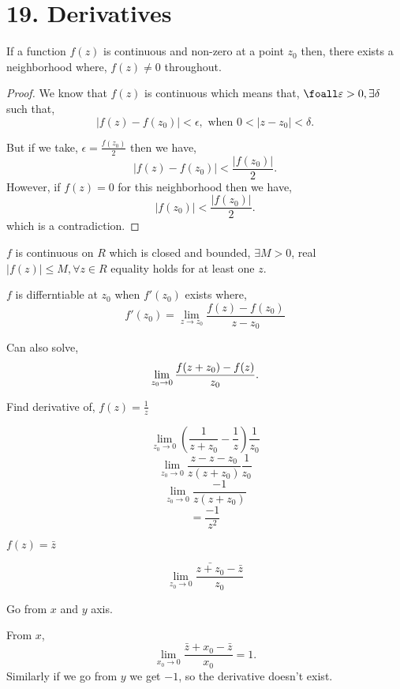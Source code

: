 \section*{19. Derivatives}
\begin{theorem}
   If a function $f(z)$ is continuous and non-zero at a point $z_0$ then, there exists a neighborhood where, $f(z) \neq 0$ throughout.
\end{theorem}
\begin{proof}
   
   We know that $f(z)$ is continuous which means that, $\foall \epsilon > 0, \exists \delta$ such that,  \[
      |f(z) - f(z_0)| < \epsilon, \text{ when } 0 < |z - z_0| < \delta
   .\] 

   But if we take, $\epsilon = \frac{f(z_0)}{2}$ then we have, \[
   |f(z) - f(z_0)| < \frac{|f(z_0)|}{2}
   .\] 
   However, if $f(z) = 0$ for this neighborhood then we have,  \[
   |f(z_0)|  < \frac{|f(z_0)|}{2}
   .\] 
   which is a contradiction.



\end{proof}

\begin{theorem}
   $f$ is continuous on $R$ which is closed and bounded, $\exists M > 0$, real $|f(z)| \leq M, \forall z \in R$  equality holds for at least one  $z$.
\end{theorem}


\begin{definition}[Derivative]
   $f$ is differntiable at $z_0$ when $f'(z_0)$ exists where, 
   $$f'(z_0) = \lim_{z \to z_0} \frac{f(z) - f(z_0)}{z-z_0}$$
\end{definition}
\begin{remark}
   Can also solve, \[
   \lim_{z_0 \to 0} \frac{f(z + z_0) - f(z)}{z_0}$$
   .\] 
\end{remark}

\begin{eg}
   Find derivative of, $f(z) = \frac{1}{z}$

   $$\lim_{z_0 \to 0} (\frac{1}{z + z_0} - \frac{1}{z}) \frac{1}{z_0}$$
   $$\lim_{z_0 \to 0} \frac{z - z - z_0}{z(z + z_0)} \frac{1}{z_0}$$
   $$\lim_{z_0 \to 0} \frac{-1}{z(z + z_0)}$$
   $$= \frac{-1}{z^2}$$
\end{eg}
\begin{eg}
   $f(z) = \bar z$

   $$\lim_{z_0 \to 0} \frac{\bar{z + z_0} - \bar z}{z_0}$$

   Go from $x$ and  $y$ axis.

   From $x$,  \[
   \lim_{x_0 \to 0} \frac{\bar z + x_0 - \bar z}{x_0}
   =1
   .\] 
   Similarly if we go from $y$ we get  $-1$, so the derivative doesn't exist.


\end{eg}

